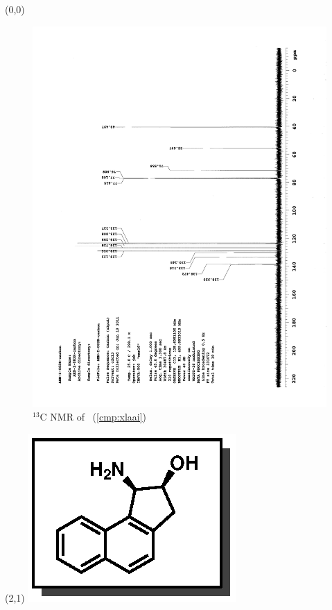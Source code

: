 \clearpage
\begin{textblock}{20}(0,0)
\begin{figure}[htb]
\caption{$^{13}$C NMR of  \CMPxlaai\ (\ref{cmp:xlaai})}
\includegraphics[scale=0.75, trim = 0mm 0mm 0mm 5mm,
clip]{chp_asymmetric/images/nmr/xlaaiC}
\vspace{-100pt}
\end{figure}
\end{textblock}
\begin{textblock}{1}(2,1)
\includegraphics[scale=0.8, angle=90]{chp_asymmetric/images/xlaai}
\end{textblock}
\clearpage

